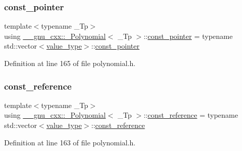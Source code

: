 \subsubsection{\texorpdfstring{const\+\_\+pointer}{const\_pointer}}
{\footnotesize\ttfamily template$<$typename \+\_\+\+Tp$>$ \\
using \hyperlink{class____gnu__cxx_1_1__Polynomial}{\+\_\+\+\_\+gnu\+\_\+cxx\+::\+\_\+\+Polynomial}$<$ \+\_\+\+Tp $>$\+::\hyperlink{class____gnu__cxx_1_1__Polynomial_aaf4c4bbd516b837df5fe70b3bda4e9af}{const\+\_\+pointer} =  typename std\+::vector$<$\hyperlink{class____gnu__cxx_1_1__Polynomial_a725563351f50e76084a7a016c06f8a53}{value\+\_\+type}$>$\+::\hyperlink{class____gnu__cxx_1_1__Polynomial_aaf4c4bbd516b837df5fe70b3bda4e9af}{const\+\_\+pointer}}



Definition at line 165 of file polynomial.\+h.

\mbox{\label{class____gnu__cxx_1_1__Polynomial_a55e17774f3387e74adb57376d099cf16}} 
\subsubsection{\texorpdfstring{const\+\_\+reference}{const\_reference}}
{\footnotesize\ttfamily template$<$typename \+\_\+\+Tp$>$ \\
using \hyperlink{class____gnu__cxx_1_1__Polynomial}{\+\_\+\+\_\+gnu\+\_\+cxx\+::\+\_\+\+Polynomial}$<$ \+\_\+\+Tp $>$\+::\hyperlink{class____gnu__cxx_1_1__Polynomial_a55e17774f3387e74adb57376d099cf16}{const\+\_\+reference} =  typename std\+::vector$<$\hyperlink{class____gnu__cxx_1_1__Polynomial_a725563351f50e76084a7a016c06f8a53}{value\+\_\+type}$>$\+::\hyperlink{class____gnu__cxx_1_1__Polynomial_a55e17774f3387e74adb57376d099cf16}{const\+\_\+reference}}



Definition at line 163 of file polynomial.\+h.

\mbox{\label{class____gnu__cxx_1_1__Polynomial_a2a042a80127ab9a7b0349a54791e59af}} 
